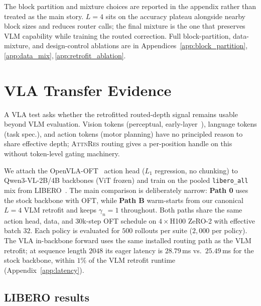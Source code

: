 \documentclass{article}
\newcommand{\attnres}{\textsc{AttnRes}}
\begin{document}
The block partition and mixture choices are reported in the appendix rather than treated as the main story. $L{=}4$ sits on the accuracy plateau alongside nearby block sizes and reduces router calls; the final mixture is the one that preserves VLM capability while training the routed correction. Full block-partition, data-mixture, and design-control ablations are in Appendices~\ref{app:block_partition},\,\ref{app:data_mix},\,\ref{app:retrofit_ablation}.


\section{VLA Transfer Evidence}
\label{sec:vla}

A VLA test asks whether the retrofitted routed-depth signal remains usable beyond VLM evaluation. Vision tokens (perceptual, early-layer~\citep{raghu2021vision}), language tokens (task spec.), and action tokens (motor planning) have no principled reason to share effective depth; \attnres{} routing gives a per-position handle on this without token-level gating machinery.

We attach the OpenVLA-OFT~\citep{kim2025openvlaoft} action head ($L_1$ regression, no chunking) to Qwen3-VL-2B/4B backbones (ViT frozen) and train on the pooled \texttt{libero\_all} mix from LIBERO~\citep{liu2023libero}. The main comparison is deliberately narrow: \textbf{Path 0} uses the stock backbone with OFT, while \textbf{Path B} warm-starts from our canonical $L{=}4$ VLM retrofit and keeps $\gamma_n{=}1$ throughout. Both paths share the same action head, data, and $30$k-step OFT schedule on $4{\times}$H100 ZeRO-2 with effective batch $32$. Each policy is evaluated for $500$ rollouts per suite ($2{,}000$ per policy). The VLA in-backbone forward uses the same installed routing path as the VLM retrofit; at sequence length $2048$ its eager latency is $28.79$\,ms vs.\ $25.49$\,ms for the stock backbone, within $1\%$ of the VLM retrofit runtime (Appendix~\ref{app:latency}).

\subsection{LIBERO results}
\label{sec:vla_results}
\end{document}
